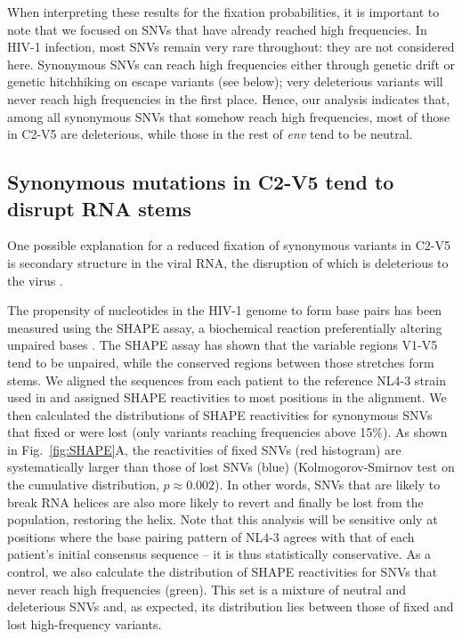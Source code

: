 \documentclass[11pt]{article}
\newcommand{\FIG}[1]{Fig.~\ref{fig:#1}}
\newcommand{\env}{\textit{env}}
\newcommand{\shankaregion}{C2-V5}
\begin{document}
When interpreting these results for the fixation probabilities, it is important
to note that we focused on SNVs that have already reached high frequencies. In
HIV-1 infection, most SNVs remain very rare throughout: they are not considered
here. Synonymous SNVs can reach high frequencies either through genetic
drift or genetic hitchhiking on escape variants (see below); very deleterious
variants will never reach high frequencies in the first place. Hence, our
analysis indicates that, among all synonymous SNVs that somehow reach high
frequencies, most of those in \shankaregion{} are deleterious, while
those in the rest of \env{} tend to be neutral.

\subsection*{Synonymous mutations in \shankaregion{} tend to disrupt RNA stems}
One possible explanation for a reduced fixation of synonymous variants in
\shankaregion{} is secondary structure in the viral RNA, the disruption of which
is deleterious to the virus \citep{forsdyke_reciprocal_1995,
snoeck_mapping_2011, sanjuan_interplay_2011}.

The propensity of nucleotides in the HIV-1 genome to form base pairs has been
measured using the SHAPE assay, a biochemical reaction preferentially altering
unpaired bases 
\citep{watts_architecture_2009}. The SHAPE assay has shown that the variable
regions V1-V5 tend to be unpaired, while the conserved regions between those
stretches form stems. We aligned the sequences from each patient to
the reference NL4-3 strain used in \citet{watts_architecture_2009} and assigned
SHAPE reactivities to most positions in the alignment. We then calculated the
distributions of SHAPE reactivities for synonymous SNVs that fixed or were
lost (only variants reaching frequencies above 15\%). As shown in
\FIG{SHAPE}A, the reactivities of fixed SNVs (red histogram) are systematically
larger than those of lost SNVs (blue) (Kolmogorov-Smirnov test on the cumulative
distribution, $p\approx 0.002$). In other words, SNVs that are likely to
break RNA helices are also more likely to revert and finally be lost from the
population, restoring the helix. Note that this analysis will be sensitive only
at positions where the base pairing pattern of NL4-3 agrees with that of each
patient's initial consensus sequence -- it is thus statistically conservative.
As a control, we also calculate the distribution of SHAPE reactivities for SNVs
that never reach high frequencies (green). This set is a mixture of neutral and
deleterious SNVs and, as expected, its distribution lies between those of
fixed and lost high-frequency variants.
\end{document}
